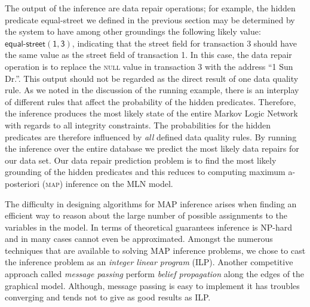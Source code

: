 The output of the inference are data repair operations; for example, the hidden predicate \textsf{equal-street} we defined in the previous section
may be determined by the system to have among other groundings the following likely value: $\mathsf{\textsf{equal-street}(1, 3)}$, indicating that
the \textsf{street} field for transaction 3 should have the same value as the \textsf{street} field of transaction 1. 
In this case, the data repair operation is to replace the \textsc{null}
value in transaction 3 with the address ``1 Sun Dr.''. This output should not be regarded as the direct result of one data quality rule. As we noted in
the discussion of the running example, there is an interplay of different rules that affect the probability of the hidden predicates. Therefore, the inference produces the most likely state of the entire Markov Logic Network with regards to all integrity constraints. The probabilities for the hidden predicates are therefore influenced by \textit{all} defined data quality rules. By running the inference over the entire database we predict the most likely data repairs for our data set. Our data repair prediction problem is to find the most likely grounding of the hidden predicates and this reduces to computing maximum a-posteriori (\textsc{map})  inference on the MLN model. 

The difficulty in designing algorithms for MAP inference arises
when finding an efficient way to reason about the large number
of possible assignments to the variables in the model. In terms
of theoretical guarantees inference is NP-hard and in many cases
cannot even be approximated. Amongst the numerous techniques 
that are available to solving MAP inference problems, we chose to cast the inference problem as an \emph{integer linear program} (ILP). Another competitive approach called \emph{message
passing} perform \emph{belief propagation} 
along the edges of the graphical model. Although, message passing is easy to implement it has troubles converging and tends not to give as good results as ILP. 
  

